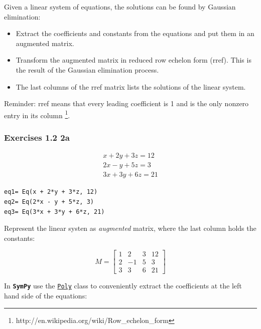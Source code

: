 \documentclass[a4paper]{article}
\newcommand{\sympy}{\textbf{\texttt{\textcolor{OliveGreen}{SymPy}} }}
\begin{document}
Given a linear system of equations, the solutions can be found by Gaussian
elimination:

\begin{itemize}
\item Extract the coefficients and constants from the equations and put them in
an augmented matrix.
\item Transform the augmented matrix in reduced row echelon form (rref). This is
the result of the Gaussian elimination process.
\item The last columns of the rref matrix lists the solutions of the linear system.
\end{itemize}

Reminder: rref means that every leading coefficient is 1 and is the only nonzero
entry in its column \footnote{http://en.wikipedia.org/wiki/Row\_echelon\_form}. 

\subsubsection{Exercises 1.2 2a}

\begin{equation}\label{eq:na}
\begin{matrix}x + 2 y + 3 z = 12\\2 x - y + 5 z = 3\\3 x + 3 y + 6 z = 21\end{matrix}
\end{equation}

\begin{verbatim}
eq1= Eq(x + 2*y + 3*z, 12)
eq2= Eq(2*x - y + 5*z, 3)
eq3= Eq(3*x + 3*y + 6*z, 21)
\end{verbatim}

Represent the linear systen as \textit{augmented} matrix, where the last column
holds the constants:

\begin{equation}\label{eq:na}
M= \left[\begin{matrix}1 & 2 & 3 & \textit{12}\\
                       2 & -1 & 5 & \textit{3}\\
                       3 & 3 & 6 & \textit{21}\end{matrix}\right]
\end{equation}

In \sympy use the \href{http://docs.sympy.org/latest/modules/polys/reference.html#sympy.polys.polytools.Poly}{\texttt{Poly}}
class to conveniently extract the coefficients at the left hand side of
the equations:
\end{document}
